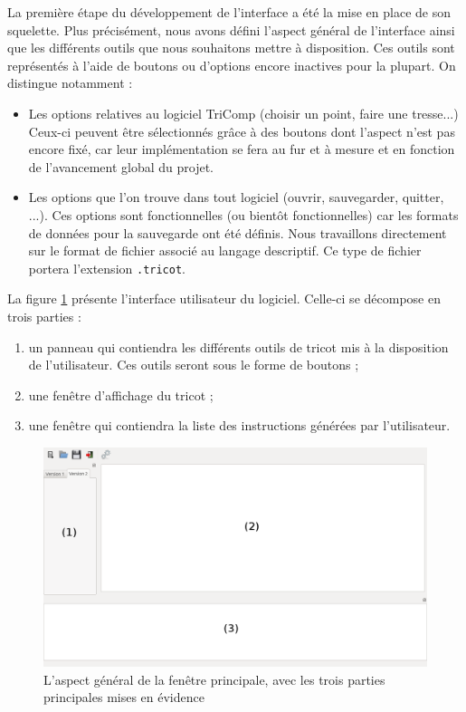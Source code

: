 \documentclass{article}
\begin{document}
La première étape du développement de l'interface a été la mise en place de son squelette. Plus précisément, nous avons défini l'aspect
général de l'interface ainsi que les différents outils que nous souhaitons mettre à disposition. Ces outils sont représentés à l'aide de
boutons ou d'options encore inactives pour la plupart. On distingue notamment :
\begin{itemize}
  \item Les options relatives au logiciel TriComp (choisir un point, faire une tresse...) Ceux-ci peuvent être sélectionnés grâce à des
boutons dont l'aspect n'est pas encore fixé, car leur implémentation se fera au fur et à mesure et en fonction de l'avancement global du
projet.
  \item Les options que l'on trouve dans tout logiciel (ouvrir, sauvegarder, quitter, ...). Ces options sont fonctionnelles (ou bientôt
fonctionnelles) car les formats de données pour la sauvegarde ont été définis. Nous travaillons directement sur le format de fichier
associé au langage descriptif. Ce type de fichier portera l'extension \texttt{.tricot}.
\end{itemize}
La figure \ref{fenetre} présente l'interface utilisateur du logiciel. Celle-ci se décompose en trois parties : 
\begin{enumerate}
   \item un panneau qui contiendra les différents outils de tricot mis à la disposition de l'utilisateur. Ces outils seront sous le forme de boutons ;
   \item une fenêtre d'affichage du tricot ;
   \item une fenêtre qui contiendra la liste des instructions générées par l'utilisateur.
\end{enumerate}

\begin{figure}[!ht]
  \begin{center}
    \includegraphics[scale=0.3]{fenetre.png}
  \end{center}
  \caption{L'aspect général de la fenêtre principale, avec les trois parties principales mises en évidence}
  \label{fenetre}
\end{figure}
\end{document}
